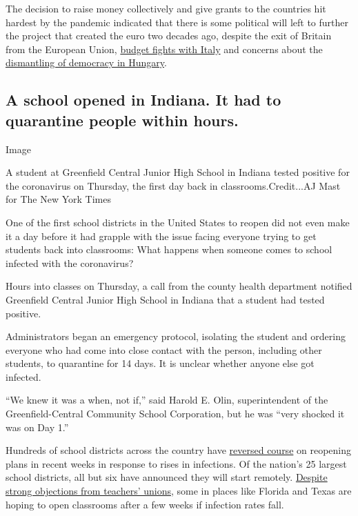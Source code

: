 The decision to raise money collectively and give grants to the
countries hit hardest by the pandemic indicated that there is some
political will left to further the project that created the euro two
decades ago, despite the exit of Britain from the European Union,
\href{https://www.ft.com/content/92ec7bc4-9d8f-11e9-9c06-a4640c9feebb}{budget
fights with Italy} and concerns about the
\href{https://www.nytimes3xbfgragh.onion/2020/06/16/world/europe/hungary-coronavirus-orban.html}{dismantling
of democracy in Hungary}.

\hypertarget{a-school-opened-in-indiana-it-had-to-quarantine-people-within-hours}{%
\subsection{A school opened in Indiana. It had to quarantine people
within
hours.}\label{a-school-opened-in-indiana-it-had-to-quarantine-people-within-hours}}

Image

A student at Greenfield Central Junior High School in Indiana tested
positive for the coronavirus on Thursday, the first day back in
classrooms.Credit...AJ Mast for The New York Times

One of the first school districts in the United States to reopen did not
even make it a day before it had grapple with the issue facing everyone
trying to get students back into classrooms: What happens when someone
comes to school infected with the coronavirus?

Hours into classes on Thursday, a call from the county health department
notified Greenfield Central Junior High School in Indiana that a student
had tested positive.

Administrators began an emergency protocol, isolating the student and
ordering everyone who had come into close contact with the person,
including other students, to quarantine for 14 days. It is unclear
whether anyone else got infected.

``We knew it was a when, not if,'' said Harold E. Olin, superintendent
of the Greenfield-Central Community School Corporation, but he was
``very shocked it was on Day 1.''

Hundreds of school districts across the country have
\href{https://www.nytimes3xbfgragh.onion/2020/07/13/us/lausd-san-diego-school-reopening.html}{reversed
course} on reopening plans in recent weeks in response to rises in
infections. Of the nation's 25 largest school districts, all but six
have announced they will start remotely.
\href{https://www.nytimes3xbfgragh.onion/2020/07/29/us/teacher-union-school-reopening-coronavirus.html}{Despite
strong objections from teachers' unions}, some in places like Florida
and Texas are hoping to open classrooms after a few weeks if infection
rates fall.

